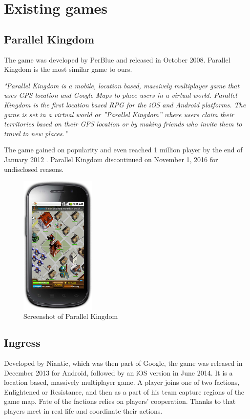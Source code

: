 
\section{Existing games}

	\subsection{Parallel Kingdom}
	The game was developed by PerBlue and released in October 2008. Parallel Kingdom is the most similar game to ours.
		
	\textit{"Parallel Kingdom is a mobile, location based, massively multiplayer game that uses GPS location and Google Maps to place users in a virtual world. Parallel Kingdom is the first location based RPG for the iOS and Android platforms. The game is set in a virtual world or ”Parallel Kingdom” where users claim their territories based on their GPS location or by making friends who invite them to travel to new places."} \cite{parallelkingdom}
	
	The game gained on popularity and even reached 1 million player by the end of January 2012 \cite{parallelkingdom1m}. Parallel Kingdom discontinued on November 1, 2016 for undisclosed reasons.
	
	\begin{figure}[h]	
		\includegraphics[width=0.33\textwidth]{figures/parallelkingdom}
		\centering			
		\caption{Screenshot of Parallel Kingdom \cite{parallelkingdomscreen}}
	\end{figure}
	
	\subsection{Ingress}
	Developed by Niantic, which was then part of Google, the game was released in December 2013 for Android, followed by an iOS version in June 2014. It is a location based, massively multiplayer game. A player joins one of two factions, Enlightened or Resistance, and then as a part of his team capture regions of the game map. Fate of the factions relies on players’ cooperation. Thanks to that players meet in real life and coordinate their actions.
	
